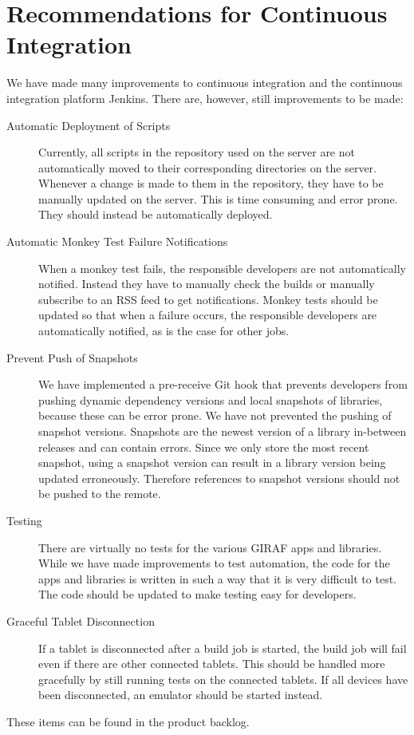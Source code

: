 \section{Recommendations for Continuous Integration}\label{sec:ci_recommendations}
We have made many improvements to continuous integration and the continuous integration platform Jenkins. There are, however, still improvements to be made:

\begin{description}
  \item[Automatic Deployment of Scripts] Currently, all scripts in the  repository used on the server are not automatically moved to their corresponding directories on the server. Whenever a change is made to them in the repository, they have to be manually updated on the server. This is time consuming and error prone. They should instead be automatically deployed.
  \item[Automatic Monkey Test Failure Notifications] When a monkey test fails, the responsible developers are not automatically notified. Instead they have to manually check the builds or manually subscribe to an RSS feed to get notifications. Monkey tests should be updated so that when a failure occurs, the responsible developers are automatically notified, as is the case for other jobs.
  \item[Prevent Push of Snapshots] We have implemented a pre-receive Git hook that prevents developers from pushing dynamic dependency versions and local snapshots of libraries, because these can be error prone. We have not prevented the pushing of snapshot versions. Snapshots are the newest version of a library in-between releases and can contain errors. Since we only store the most recent snapshot, using a snapshot version can result in a library version being updated erroneously. Therefore references to snapshot versions should not be pushed to the remote.
  \item[Testing] There are virtually no tests for the various GIRAF apps and libraries. While we have made improvements to test automation, the code for the apps and libraries is written in such a way that it is very difficult to test. The code should be updated to make testing easy for developers.
  \item[Graceful Tablet Disconnection] If a tablet is disconnected after a build job is started, the build job will fail even if there are other connected tablets. This should be handled more gracefully by still running tests on the connected tablets. If all devices have been disconnected, an emulator should be started instead.
\end{description}

These items can be found in the product backlog.